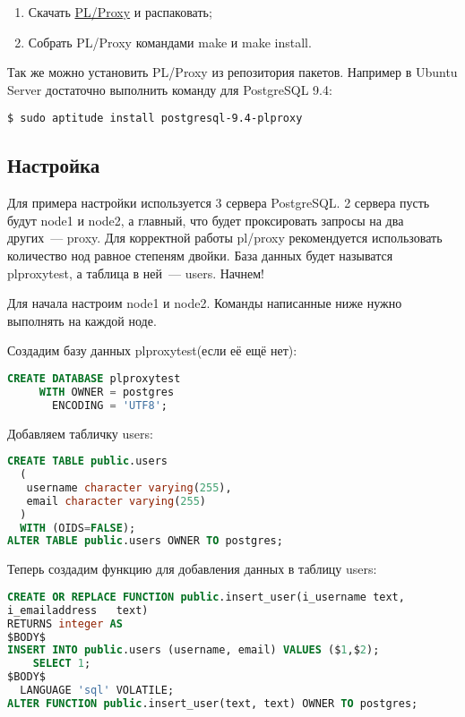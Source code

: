 \begin{enumerate}
  \item Скачать \href{http://pgfoundry.org/projects/plproxy}{PL/Proxy} и распаковать;
  \item Собрать PL/Proxy командами make и make install.
\end{enumerate}

Так же можно установить PL/Proxy из репозитория пакетов. Например в Ubuntu Server достаточно выполнить команду для PostgreSQL 9.4:

\begin{lstlisting}[label=lst:plproxy1,caption=Установка]
$ sudo aptitude install postgresql-9.4-plproxy
\end{lstlisting}

\subsection{Настройка}

Для примера настройки используется 3 сервера PostgreSQL. 2 сервера пусть будут node1 и node2, а главный, что будет проксировать запросы на два других~--- proxy. Для корректной работы pl/proxy рекомендуется использовать количество нод равное степеням двойки. База данных будет называтся plproxytest, а таблица в ней~--- users. Начнем!

Для начала настроим node1 и node2. Команды написанные ниже нужно выполнять на каждой ноде.

Создадим базу данных plproxytest(если её ещё нет):

\begin{lstlisting}[language=SQL,label=lst:plproxy2,caption=Настройка]
CREATE DATABASE plproxytest
     WITH OWNER = postgres
       ENCODING = 'UTF8';
\end{lstlisting}

Добавляем табличку users:

\begin{lstlisting}[language=SQL,label=lst:plproxy3,caption=Настройка]
CREATE TABLE public.users
  (
   username character varying(255),
   email character varying(255)
  )
  WITH (OIDS=FALSE);
ALTER TABLE public.users OWNER TO postgres;
\end{lstlisting}

Теперь создадим функцию для добавления данных в таблицу users:

\begin{lstlisting}[language=SQL,label=lst:plproxy4,caption=Настройка]
CREATE OR REPLACE FUNCTION public.insert_user(i_username text,
i_emailaddress   text)
RETURNS integer AS
$BODY$
INSERT INTO public.users (username, email) VALUES ($1,$2);
    SELECT 1;
$BODY$
  LANGUAGE 'sql' VOLATILE;
ALTER FUNCTION public.insert_user(text, text) OWNER TO postgres;
\end{lstlisting}


